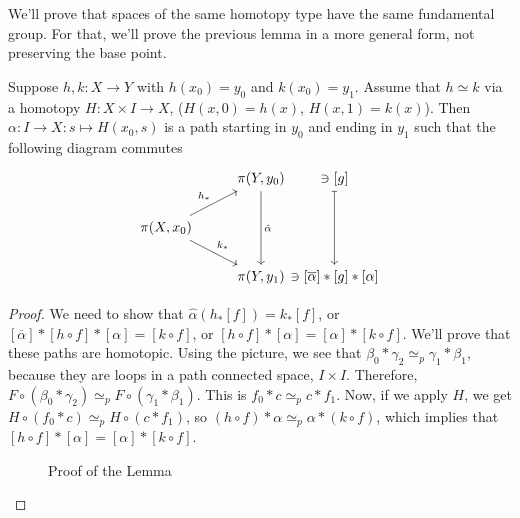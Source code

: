 We'll prove that spaces of the same homotopy type have the same fundamental group.
For that, we'll prove the previous lemma in a more general form, not preserving the base point.
\begin{lemma}[58.4]
    Suppose $h, k: X \to Y$ with $h(x_0) = y_0$ and $k(x_0) = y_1$.
    Assume that $h \simeq k$ via a homotopy $H: X \times I \to X$, ($H(x, 0) = h(x)$,  $H(x, 1) = k(x)$).
    Then $\alpha: I \to X: s \mapsto H(x_0, s)$ is a path starting in $y_0$ and ending in $y_1$ such that the following diagram commutes
    \[
        \begin{tikzcd}
        & \pi(Y, y_0) \arrow[dd, "\hat{\alpha}"] &[-1cm]\ni [g] \arrow[dd, mapsto]\\
        \pi(X, x_0) \arrow[ur, "h_*"] \arrow[dr, "k_*"]  &&\\
                                                         & \pi(Y, y_1) &\ni [\overline{\alpha}] * [g] * [\alpha]
    \end{tikzcd}
    \] 
\end{lemma}
\begin{proof}
    We need to show that $\hat{\alpha} (h_*[f]) = k_*[f]$, or $[\overline{\alpha}] * [h  \circ  f] * [\alpha] = [ k  \circ  f]$, or $[ h  \circ  f] * [\alpha] = [\alpha] * [k  \circ f]$.
    We'll prove that these paths are homotopic.
    Using the picture, we see that $\beta_0 * \gamma_2 \simeq_p \gamma_1 * \beta_1$, because they are loops in a path connected space, $I \times I$.
    Therefore, $F  \circ (\beta_0 * \gamma_2) \simeq_p F  \circ  (\gamma_1* \beta_1)$.
    This is $f_0 * c \simeq_p c * f_1$.
    Now, if we apply $H$, we get $ H  \circ (f_0 * c) \simeq_p H  \circ (c * f_1)$, so $(h  \circ  f) * \alpha \simeq_p  \alpha * (k  \circ  f)$, which implies that $[h  \circ f] * [\alpha] = [\alpha] * [k  \circ  f]$.

\begin{figure}[H]
    \centering
    \caption{Proof of the Lemma}
    \label{fig:proof-lemma-7}
\end{figure}
\end{proof}


